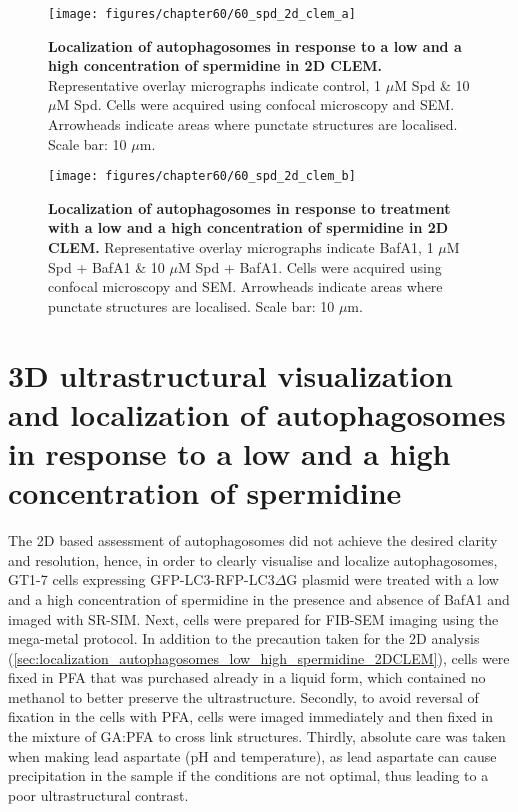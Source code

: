 \begin{landscape}
\begin{figure}[!htbp]
\center
 \texttt{[image: figures/chapter60/60\_spd\_2d\_clem\_a]}
 \caption[Localization of autophagosomes in response to a low and a high concentration of spermidine in 2D CLEM]{\textbf{Localization of autophagosomes in response to a low and a high concentration of spermidine in 2D CLEM.} Representative overlay micrographs indicate control, 1 $\mu$M Spd \& 10 $\mu$M Spd. Cells were acquired using confocal microscopy and SEM. Arrowheads indicate areas where punctate structures are localised. Scale bar: 10 $\mu$m.}
 \label{fig:60_spd_2d_clem_a}
\end{figure} 
\end{landscape}

\begin{landscape}
\begin{figure}[!htbp]
\centering
 \texttt{[image: figures/chapter60/60\_spd\_2d\_clem\_b]}
 \caption[Localization of autophagosomes in response to treatment with a low and a high concentration of spermidine in 2D CLEM]{\textbf{Localization of autophagosomes in response to treatment with a low and a high concentration of spermidine in 2D CLEM.} Representative overlay micrographs indicate BafA1, 1 $\mu$M Spd + BafA1 \& 10 $\mu$M Spd + BafA1. Cells were acquired using confocal microscopy and SEM. Arrowheads indicate areas where punctate structures are localised. Scale bar: 10 $\mu$m.}
 \label{fig:60_spd_2d_clem_b}
\end{figure} 
\end{landscape}

\section{3D ultrastructural visualization and localization of autophagosomes in response to a low and a high concentration of spermidine}
The 2D based assessment of autophagosomes did not achieve the desired clarity and resolution, hence, in order to clearly visualise and localize autophagosomes, GT1-7 cells expressing GFP-LC3-RFP-LC3$\Delta$G plasmid were treated with a low and a high concentration of spermidine in the presence and absence of BafA1 and imaged with SR-SIM. Next, cells were prepared for FIB-SEM imaging using the mega-metal protocol. In addition to the precaution taken for the 2D analysis (\cref{sec:localization_autophagosomes_low_high_spermidine_2DCLEM}), cells were fixed in PFA that was purchased already in a liquid form, which contained no methanol to better preserve the ultrastructure. Secondly, to avoid reversal of fixation in the cells with PFA, cells were imaged immediately and then fixed in the mixture of GA:PFA to cross link structures. Thirdly, absolute care was taken when making lead aspartate (pH and temperature), as lead aspartate can cause precipitation in the sample if the conditions are not optimal, thus leading to a poor ultrastructural contrast.

